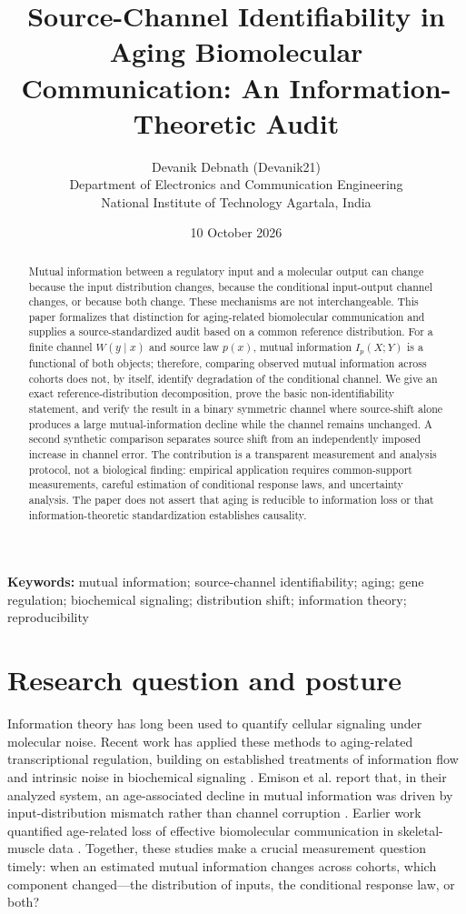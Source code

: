 \documentclass[11pt]{article}
\title{Source-Channel Identifiability in Aging Biomolecular Communication: An Information-Theoretic Audit}
\author{Devanik Debnath (Devanik21)\\\small Department of Electronics and Communication Engineering\\\small National Institute of Technology Agartala, India}
\date{10 October 2026}
\begin{document}
\maketitle
\begin{abstract}
Mutual information between a regulatory input and a molecular output can change because the input distribution changes, because the conditional input-output channel changes, or because both change. These mechanisms are not interchangeable. This paper formalizes that distinction for aging-related biomolecular communication and supplies a source-standardized audit based on a common reference distribution. For a finite channel $W(y\mid x)$ and source law $p(x)$, mutual information $I_p(X;Y)$ is a functional of both objects; therefore, comparing observed mutual information across cohorts does not, by itself, identify degradation of the conditional channel. We give an exact reference-distribution decomposition, prove the basic non-identifiability statement, and verify the result in a binary symmetric channel where source-shift alone produces a large mutual-information decline while the channel remains unchanged. A second synthetic comparison separates source shift from an independently imposed increase in channel error. The contribution is a transparent measurement and analysis protocol, not a biological finding: empirical application requires common-support measurements, careful estimation of conditional response laws, and uncertainty analysis. The paper does not assert that aging is reducible to information loss or that information-theoretic standardization establishes causality.
\end{abstract}

\noindent\textbf{Keywords:} mutual information; source-channel identifiability; aging; gene regulation; biochemical signaling; distribution shift; information theory; reproducibility

\section{Research question and posture}
Information theory has long been used to quantify cellular signaling under molecular noise. Recent work has applied these methods to aging-related transcriptional regulation, building on established treatments of information flow and intrinsic noise in biochemical signaling \cite{rhee2012,suderman2018}. Emison et al. report that, in their analyzed system, an age-associated decline in mutual information was driven by input-distribution mismatch rather than channel corruption \cite{emison2026}. Earlier work quantified age-related loss of effective biomolecular communication in skeletal-muscle data \cite{sivakumar2025}. Together, these studies make a crucial measurement question timely: when an estimated mutual information changes across cohorts, which component changed—the distribution of inputs, the conditional response law, or both?
\end{document}
